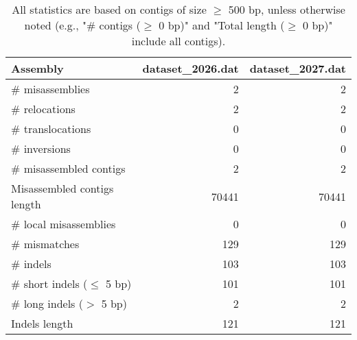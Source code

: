 \documentclass[12pt,a4paper]{article}
\begin{document}
\begin{table}[ht]
\begin{center}
\caption{All statistics are based on contigs of size $\geq$ 500 bp, unless otherwise noted (e.g., "\# contigs ($\geq$ 0 bp)" and "Total length ($\geq$ 0 bp)" include all contigs).}
\begin{tabular}{|l*{2}{|r}|}
\hline
Assembly & dataset\_2026.dat & dataset\_2027.dat \\ \hline
\# misassemblies & 2 & 2 \\ \hline
\hspace{5mm}\# relocations & 2 & 2 \\ \hline
\hspace{5mm}\# translocations & 0 & 0 \\ \hline
\hspace{5mm}\# inversions & 0 & 0 \\ \hline
\# misassembled contigs & 2 & 2 \\ \hline
Misassembled contigs length & 70441 & 70441 \\ \hline
\# local misassemblies & 0 & 0 \\ \hline
\# mismatches & 129 & 129 \\ \hline
\# indels & 103 & 103 \\ \hline
\hspace{5mm}\# short indels ($\leq$ 5 bp) & 101 & 101 \\ \hline
\hspace{5mm}\# long indels ($>$ 5 bp) & 2 & 2 \\ \hline
Indels length & 121 & 121 \\ \hline
\end{tabular}
\end{center}
\end{table}
\end{document}
